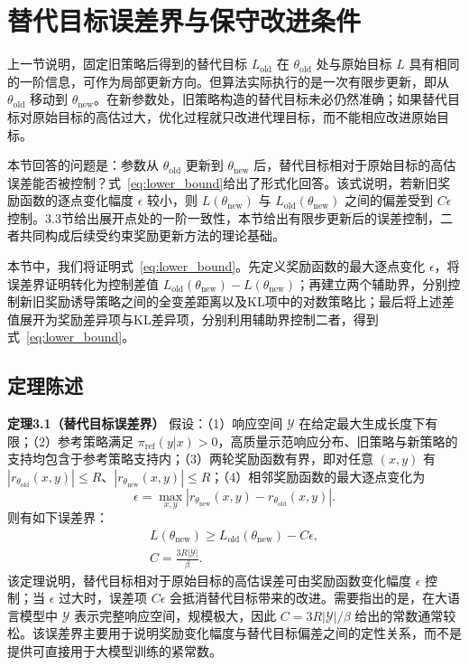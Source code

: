 \section{替代目标误差界与保守改进条件}

上一节说明，固定旧策略后得到的替代目标 $L_{\mathrm{old}}$ 在 $\theta_{\mathrm{old}}$ 处与原始目标 $L$ 具有相同的一阶信息，可作为局部更新方向。但算法实际执行的是一次有限步更新，即从 $\theta_{\mathrm{old}}$ 移动到 $\theta_{\mathrm{new}}$。在新参数处，旧策略构造的替代目标未必仍然准确；如果替代目标对原始目标的高估过大，优化过程就只改进代理目标，而不能相应改进原始目标。

本节回答的问题是：参数从 $\theta_{\mathrm{old}}$ 更新到 $\theta_{\mathrm{new}}$ 后，替代目标相对于原始目标的高估误差能否被控制？式~\eqref{eq:lower_bound}给出了形式化回答。该式说明，若新旧奖励函数的逐点变化幅度 $\epsilon$ 较小，则 $L(\theta_{\mathrm{new}})$ 与 $L_{\mathrm{old}}(\theta_{\mathrm{new}})$ 之间的偏差受到 $C\epsilon$ 控制。3.3节给出展开点处的一阶一致性，本节给出有限步更新后的误差控制，二者共同构成后续受约束奖励更新方法的理论基础。

本节中，我们将证明式~\eqref{eq:lower_bound}。先定义奖励函数的最大逐点变化 $\epsilon$，将误差界证明转化为控制差值 $L_{\mathrm{old}}(\theta_{\mathrm{new}})-L(\theta_{\mathrm{new}})$；再建立两个辅助界，分别控制新旧奖励诱导策略之间的全变差距离以及KL项中的对数策略比；最后将上述差值展开为奖励差异项与KL差异项，分别利用辅助界控制二者，得到式~\eqref{eq:lower_bound}。

\subsection{定理陈述}

\noindent\textbf{定理3.1（替代目标误差界）}
假设：（1）响应空间 $\mathcal{Y}$ 在给定最大生成长度下有限；（2）参考策略满足 $\pi_{\mathrm{ref}}(y|x)>0$，高质量示范响应分布、旧策略与新策略的支持均包含于参考策略支持内；（3）两轮奖励函数有界，即对任意 $(x,y)$ 有 $|r_{\theta_{\mathrm{old}}}(x,y)|\le R$、$|r_{\theta_{\mathrm{new}}}(x,y)|\le R$；（4）相邻奖励函数的最大逐点变化为
\begin{equation}
    \epsilon=
    \max_{x,y}\left|r_{\theta_{\mathrm{new}}}(x,y)-r_{\theta_{\mathrm{old}}}(x,y)\right|.
    \label{eq:epsilon_def}
\end{equation}
则有如下误差界：
\begin{equation}
\begin{gathered}
    L(\theta_{\mathrm{new}})
    \ge
    L_{\mathrm{old}}(\theta_{\mathrm{new}})-C\epsilon,\\
    C=\frac{3R|\mathcal{Y}|}{\beta}.
    \label{eq:lower_bound}
\end{gathered}
\end{equation}
该定理说明，替代目标相对于原始目标的高估误差可由奖励函数变化幅度 $\epsilon$ 控制；当 $\epsilon$ 过大时，误差项 $C\epsilon$ 会抵消替代目标带来的改进。需要指出的是，在大语言模型中 $\mathcal{Y}$ 表示完整响应空间，规模极大，因此 $C=3R|\mathcal{Y}|/\beta$ 给出的常数通常较松。该误差界主要用于说明奖励变化幅度与替代目标偏差之间的定性关系，而不是提供可直接用于大模型训练的紧常数。

